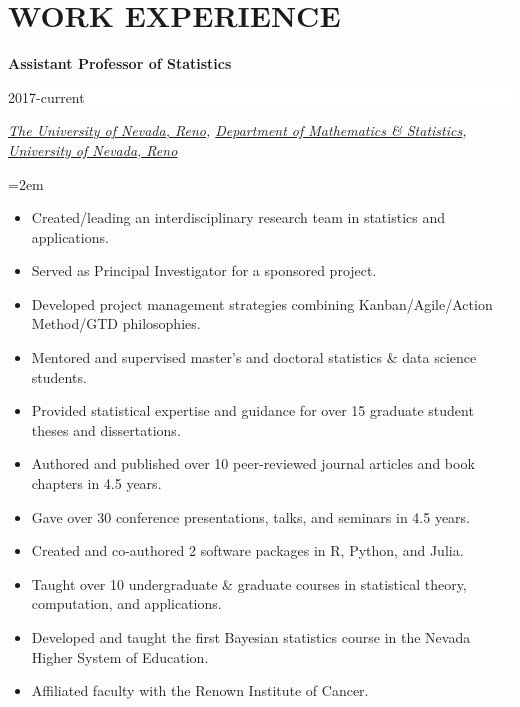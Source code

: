 \documentclass[paper=a4,fontsize=11pt]{scrartcl} %
\newcommand{\sepspace}{\vspace*{1em}}		%
\newcommand{\NewPart}[2]{\section*{\uppercase{#1} #2 }}
\newcommand{\EducationEntry}[4]{
		\noindent \textbf{#1} \hfill      %
		\colorbox{White}{%
			\parbox{6em}{%
			\hfill\color{Black}#2}} \par  %
		\noindent \textit{#3} \par        %
		\noindent\hangindent=2em\hangafter=0 \small #4 %
		\normalsize \par \vspace{-7pt}}
\begin{document}
\NewPart{Work experience}{}
\vspace{-7pt}

\EducationEntry{Assistant Professor of Statistics}{2017-current}{{\href{https://www.unr.edu/}{The University of Nevada, Reno}}, {\href{https://www.unr.edu/math/}{Department of Mathematics \& Statistics}}, {\href{http://www.unr.edu/}{University of Nevada, Reno}}}{
  \begin{itemize}
  \item Created/leading an interdisciplinary research team in statistics and applications.
  \item Served as Principal Investigator for a sponsored project.
   \item Developed project management strategies combining Kanban/Agile/Action Method/GTD philosophies.
    \item Mentored and supervised master's and doctoral statistics \& data science students.
    \item Provided statistical expertise and guidance for over 15 graduate student theses and dissertations.
    \item Authored and published over 10 peer-reviewed journal articles and book chapters in 4.5 years.
    \item Gave over 30 conference presentations, talks, and seminars in 4.5 years.
    \item Created and co-authored 2 software packages in R, Python, and Julia.
    \item Taught over 10 undergraduate \& graduate courses in statistical theory, computation, and applications.
    \item Developed and taught the first Bayesian statistics course in the Nevada Higher System of Education.
      \item Affiliated faculty with the Renown Institute of Cancer.
  \end{itemize}}
\sepspace
\end{document}
